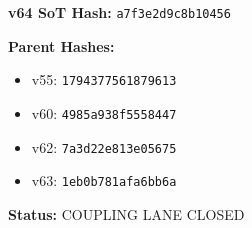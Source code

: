 \documentclass[11pt,a4paper]{article}
\theoremstyle{definition}
\begin{document}
\begin{statusbox}
\textbf{v64 SoT Hash:} \texttt{a7f3e2d9c8b10456}

\textbf{Parent Hashes:}
\begin{itemize}
  \item v55: \texttt{1794377561879613}
  \item v60: \texttt{4985a938f5558447}
  \item v62: \texttt{7a3d22e813e05675}
  \item v63: \texttt{1eb0b781afa6bb6a}
\end{itemize}

\textbf{Status:} COUPLING LANE CLOSED
\end{statusbox}
\end{document}
